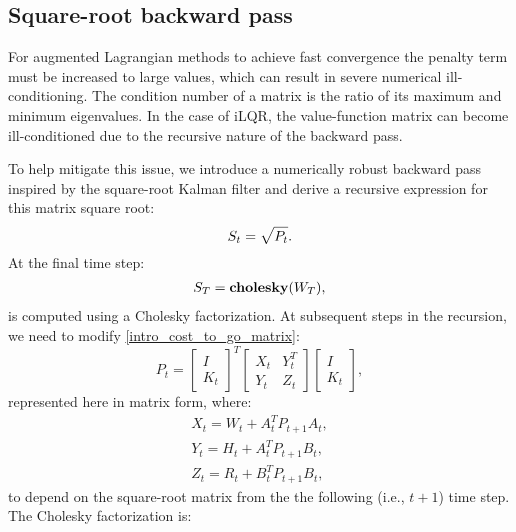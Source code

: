 \subsection{Square-root backward pass}
For augmented Lagrangian methods to achieve fast convergence the penalty term must be increased to large values, which can result in severe numerical ill-conditioning. The condition number of a matrix is the ratio of its maximum and minimum eigenvalues. In the case of iLQR, the value-function matrix can become ill-conditioned due to the recursive nature of the backward pass.

To help mitigate this issue, we introduce a numerically robust backward pass inspired by the square-root Kalman filter \cite{kaminski1971discrete} and derive a recursive expression for this matrix square root: 
\begin{equation}
	S_t = \sqrt{P_t}. \\
\end{equation}
At the final time step:
\begin{align}
	S_T = \mbox{\textbf{cholesky}}(W_T),
\end{align}
is computed using a Cholesky factorization. At subsequent steps in the recursion, we need to modify \eqref{intro_cost_to_go_matrix}:
\begin{equation}
P_t = \begin{bmatrix} I \\ K_t \end{bmatrix}^T 
	  \begin{bmatrix} X_t & Y_t^T \\ Y_t & Z_t \end{bmatrix}
	  \begin{bmatrix} I \\ K_t \end{bmatrix},
\end{equation}
represented here in matrix form, where:
\begin{align}
	X_t = W_t + A_t^T P_{t+1} A_t, \\
	Y_t = H_t + A_t^T P_{t+1} B_t, \\
	Z_t = R_t + B_t^T P_{t+1} B_t,
\end{align}
to depend on the square-root matrix from the the following (i.e., $t+1$) time step. The Cholesky factorization is:
